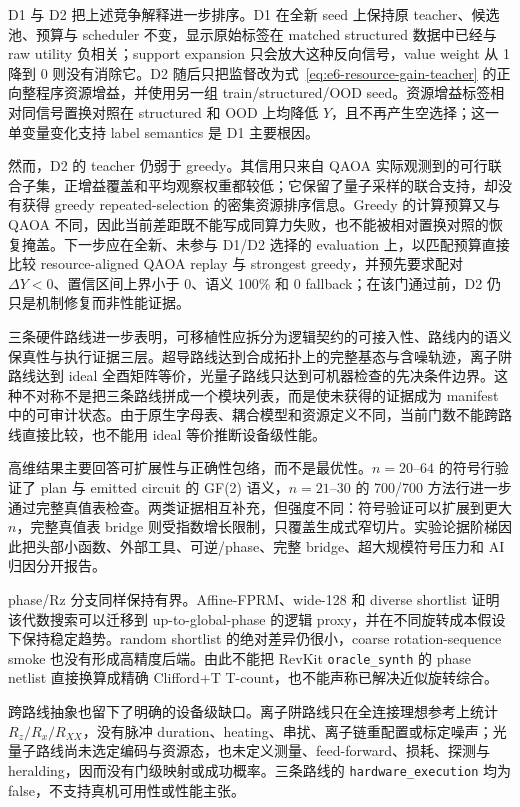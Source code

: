 \documentclass[UTF8,fontset=fandol,11pt]{ctexart}
\begin{document}
D1 与 D2 把上述竞争解释进一步排序。D1 在全新 seed 上保持原 teacher、候选池、预算与 scheduler 不变，显示原始标签在 matched structured 数据中已经与 raw utility 负相关；support expansion 只会放大这种反向信号，value weight 从 1 降到 0 则没有消除它。D2 随后只把监督改为式~\eqref{eq:e6-resource-gain-teacher} 的正向整程序资源增益，并使用另一组 train/structured/OOD seed。资源增益标签相对同信号置换对照在 structured 和 OOD 上均降低 $Y$，且不再产生空选择；这一单变量变化支持 label semantics 是 D1 主要根因。

然而，D2 的 teacher 仍弱于 greedy。其信用只来自 QAOA 实际观测到的可行联合子集，正增益覆盖和平均观察权重都较低；它保留了量子采样的联合支持，却没有获得 greedy repeated-selection 的密集资源排序信息。Greedy 的计算预算又与 QAOA 不同，因此当前差距既不能写成同算力失败，也不能被相对置换对照的恢复掩盖。下一步应在全新、未参与 D1/D2 选择的 evaluation 上，以匹配预算直接比较 resource-aligned QAOA replay 与 strongest greedy，并预先要求配对 $\Delta Y<0$、置信区间上界小于 0、语义 100\% 和 0 fallback；在该门通过前，D2 仍只是机制修复而非性能证据。

三条硬件路线进一步表明，可移植性应拆分为逻辑契约的可接入性、路线内的语义保真性与执行证据三层。超导路线达到合成拓扑上的完整基态与含噪轨迹，离子阱路线达到 ideal 全酉矩阵等价，光量子路线只达到可机器检查的先决条件边界。这种不对称不是把三条路线拼成一个模块列表，而是使未获得的证据成为 manifest 中的可审计状态。由于原生字母表、耦合模型和资源定义不同，当前门数不能跨路线直接比较，也不能用 ideal 等价推断设备级性能。

高维结果主要回答可扩展性与正确性包络，而不是最优性。$n=20$--$64$ 的符号行验证了 plan 与 emitted circuit 的 GF(2) 语义，$n=21$--$30$ 的 700/700 方法行进一步通过完整真值表检查。两类证据相互补充，但强度不同：符号验证可以扩展到更大 $n$，完整真值表 bridge 则受指数增长限制，只覆盖生成式窄切片。实验论据阶梯因此把头部小函数、外部工具、可逆/phase、完整 bridge、超大规模符号压力和 AI 归因分开报告。

phase/Rz 分支同样保持有界。Affine-FPRM、wide-128 和 diverse shortlist 证明该代数搜索可以迁移到 up-to-global-phase 的逻辑 proxy，并在不同旋转成本假设下保持稳定趋势。random shortlist 的绝对差异仍很小，coarse rotation-sequence smoke 也没有形成高精度后端。由此不能把 RevKit \texttt{oracle\_synth} 的 phase netlist 直接换算成精确 Clifford+T T-count，也不能声称已解决近似旋转综合。

跨路线抽象也留下了明确的设备级缺口。离子阱路线只在全连接理想参考上统计 $R_z/R_x/R_{XX}$，没有脉冲 duration、heating、串扰、离子链重配置或标定噪声；光量子路线尚未选定编码与资源态，也未定义测量、feed-forward、损耗、探测与 heralding，因而没有门级映射或成功概率。三条路线的 \texttt{hardware\_execution} 均为 false，不支持真机可用性或性能主张。
\end{document}
